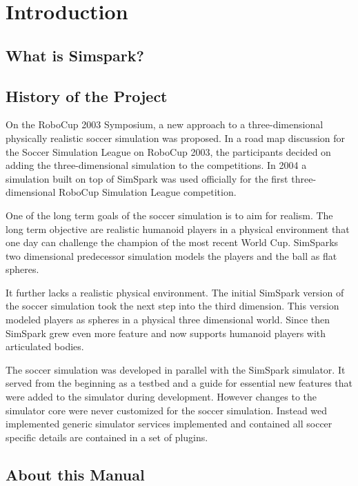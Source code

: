 \chapter{Introduction}

\section{What is Simspark?}

\section{History of the Project}


On the RoboCup 2003 Symposium, a new approach to a three-dimensional
physically realistic soccer simulation was proposed. In a road map
discussion for the Soccer Simulation League on RoboCup 2003, the
participants decided on adding the three-dimensional simulation to the
competitions. In 2004 a simulation built on top of SimSpark was used
officially for the first three-dimensional RoboCup Simulation League
competition.

One of the long term goals of the soccer simulation is to aim for
realism. The long term objective are realistic humanoid players in a
physical environment that one day can challenge the champion of the
most recent World Cup. SimSparks two dimensional predecessor
simulation models the players and the ball as flat spheres.

It further lacks a realistic physical environment. The initial
SimSpark version of the soccer simulation took the next step into the
third dimension. This version modeled players as spheres in a physical
three dimensional world. Since then SimSpark grew even more feature
and now supports humanoid players with articulated bodies.

The soccer simulation was developed in parallel with the SimSpark
simulator. It served from the beginning as a testbed and a guide for
essential new features that were added to the simulator during
development. However changes to the simulator core were never
customized for the soccer simulation. Instead wed implemented generic
simulator services implemented and contained all soccer specific
details are contained in a set of plugins.

\section{About this Manual}

